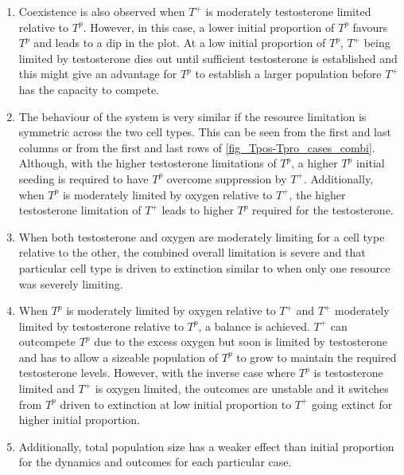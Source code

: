 \begin{enumerate}
  \item Coexistence is also observed when $T^+$ is moderately testosterone limited relative to $T^p$. However, in this case, a lower initial proportion of $T^p$ favours $T^p$ and leads to a dip in the plot. At a low initial proportion of $T^p$, $T^+$ being limited by testosterone dies out until sufficient testosterone is established and this might give an advantage for $T^p$ to establish a larger population before $T^+$ has the capacity to compete.
  \item The behaviour of the system is very similar if the resource limitation is symmetric across the two cell types. This can be seen from the first and last columns or from the first and last rows of \autoref{fig_Tpos-Tpro_cases_combi}. Although, with the higher testosterone limitations of $T^p$, a higher $T^p$ initial seeding is required to have $T^p$ overcome suppression by $T^+$. Additionally, when $T^p$ is moderately limited by oxygen relative to $T^+$, the higher testosterone limitation of $T^+$ leads to higher $T^p$ required for the testosterone.
  \item When both testosterone and oxygen are moderately limiting for a cell type relative to the other, the combined overall limitation is severe and that particular cell type is driven to extinction similar to when only one resource was severely limiting.
  \item When $T^p$ is moderately limited by oxygen relative to $T^+$ and $T^+$ moderately limited by testosterone relative to $T^p$, a balance is achieved. $T^+$ can outcompete $T^p$ due to the excess oxygen but soon is limited by testosterone and has to allow a sizeable population of $T^p$ to grow to maintain the required testosterone levels. However, with the inverse case where $T^p$ is testosterone limited and $T^+$ is oxygen limited, the outcomes are unstable and it switches from $T^p$ driven to extinction at low initial proportion to $T^+$ going extinct for higher initial proportion.
  \item Additionally, total population size has a weaker effect than initial proportion for the dynamics and outcomes for each particular case.
\end{enumerate}

